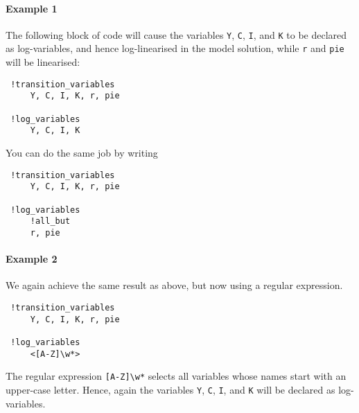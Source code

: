  \paragraph{Example 1}
 
 The following block of code will cause the variables \texttt{Y},
 \texttt{C}, \texttt{I}, and \texttt{K} to be declared as log-variables,
 and hence log-linearised in the model solution, while \texttt{r} and
 \texttt{pie} will be linearised:
 
 \begin{verbatim}
 !transition_variables
     Y, C, I, K, r, pie
 
 !log_variables
     Y, C, I, K
 \end{verbatim}
 
 You can do the same job by writing
 
 \begin{verbatim}
 !transition_variables
     Y, C, I, K, r, pie
 
 !log_variables
     !all_but
     r, pie
 \end{verbatim}
 
 \paragraph{Example 2}
 
 We again achieve the same result as above, but now using a regular
 expression.
 
 \begin{verbatim}
 !transition_variables
     Y, C, I, K, r, pie
 
 !log_variables
     <[A-Z]\w*>
 \end{verbatim}
 
 The regular expression \texttt{{[}A-Z{]}\textbackslash{}w*} selects all
 variables whose names start with an upper-case letter. Hence, again the
 variables \texttt{Y}, \texttt{C}, \texttt{I}, and \texttt{K} will be
 declared as log-variables.


